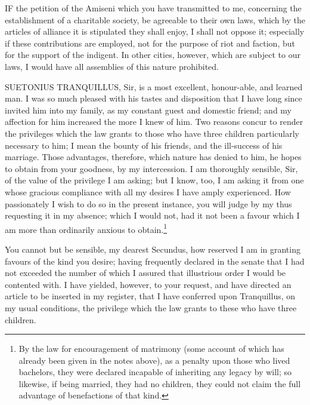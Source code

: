 
IF the petition of the Amiseni which you have transmitted to me,
concerning the establishment of a charitable society, be agreeable to
their own laws, which by the articles of alliance it is stipulated they
shall enjoy, I shall not oppose it; especially if these contributions are
employed, not for the purpose of riot and faction, but for the support of
the indigent. In other cities, however, which are subject to our laws, I
would have all assemblies of this nature prohibited.


SUETONIUS TRANQUILLUS, Sir, is a most excellent, honour-able, and learned
man. I was so much pleased with his tastes and disposition that I have
long since invited him into my family, as my constant guest and domestic
friend; and my affection for him increased the more I knew of him. Two
reasons concur to render the privileges which the law grants to those who
have three children particularly necessary to him; I mean the bounty of
his friends, and the ill-success of his marriage. Those advantages,
therefore, which nature has denied to him, he hopes to obtain from your
goodness, by my intercession. I am thoroughly sensible, Sir, of the value
of the privilege I am asking; but I know, too, I am asking it from one
whose gracious compliance with all my desires I have amply experienced.
How passionately I wish to do so in the present instance, you will judge
by my thus requesting it in my absence; which I would not, had it not been
a favour which I am more than ordinarily anxious to obtain.\footnote{By the law for
encouragement of matrimony (some account of which has already been given
in the notes above), as a penalty upon those who lived bachelors, they
were declared incapable of inheriting any legacy by will; so likewise, if
being married, they had no children, they could not claim the full
advantage of benefactions of that kind.}


You cannot but be sensible, my dearest Secundus, how reserved I am in
granting favours of the kind you desire; having frequently declared in the
senate that I had not exceeded the number of which I assured that
illustrious order I would be contented with. I have yielded, however, to
your request, and have directed an article to be inserted in my register,
that I have conferred upon Tranquillus, on my usual conditions, the
privilege which the law grants to these who have three children.

